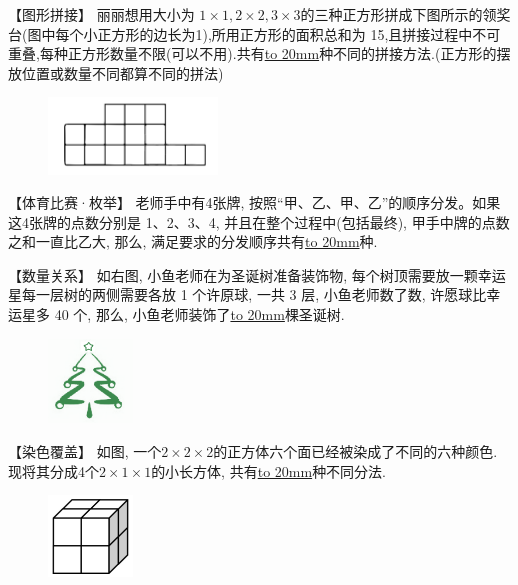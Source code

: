 \item {
    【图形拼接】
    丽丽想用大小为 $1\times 1, 2\times 2, 3\times 3$的三种正方形拼成下图所示的领奖台(图中每个小正方形的边长为1),所用正方形的面积总和为 15,且拼接过程中不可重叠,每种正方形数量不限(可以不用).共有\underline{\hbox to 20mm{}}种不同的拼接方法.(正方形的摆放位置或数量不同都算不同的拼法)
    \begin{figure}[H] 
        \centering
        \includegraphics[width=0.4\textwidth]{./pics/Chapter_4/9.png}
    \end{figure}
}

\item {
    【体育比赛·枚举】
    老师手中有4张牌, 按照``甲、乙、甲、乙''的顺序分发。如果这4张牌的点数分别是 1、2、3、4, 并且在整个过程中(包括最终), 甲手中牌的点数之和一直比乙大, 那么, 满足要求的分发顺序共有\underline{\hbox to 20mm{}}种.
    \vspace{1cm}
}

\item {
    【数量关系】
    如右图, 小鱼老师在为圣诞树准备装饰物, 每个树顶需要放一颗幸运星每一层树的两侧需要各放 1 个许原球, 一共 3 层, 小鱼老师数了数, 许愿球比幸运星多 40 个, 那么, 小鱼老师装饰了\underline{\hbox to 20mm{}}棵圣诞树.
    \begin{figure}[H] 
        \centering
        \includegraphics[width=0.2\textwidth]{./pics/Chapter_4/13.png}
    \end{figure}
}

\item {
    【染色覆盖】
    如图, 一个$2\times 2\times 2$的正方体六个面已经被染成了不同的六种颜色. 现将其分成4个$2\times 1\times 1$的小长方体, 共有\underline{\hbox to 20mm{}}种不同分法.
    \begin{figure}[H] 
        \centering
        \includegraphics[width=0.2\textwidth]{./pics/Chapter_4/15.png}
    \end{figure}
}

